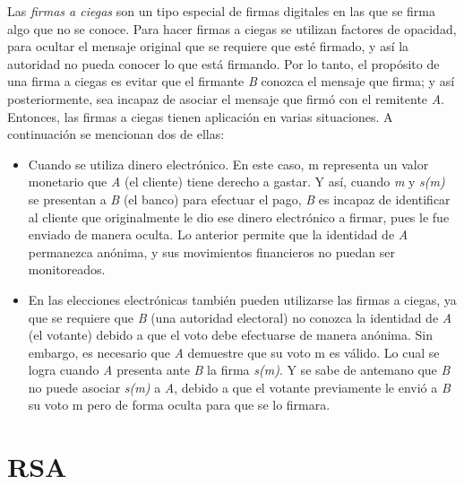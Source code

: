 Las \textit{firmas a ciegas} son un tipo especial de firmas digitales en las que se firma algo que no se conoce. Para hacer firmas a ciegas se utilizan factores de opacidad, para ocultar el mensaje original que se requiere que esté firmado, y así la autoridad no pueda conocer lo que está firmando.
Por lo tanto, el propósito de una firma a ciegas es evitar que el firmante \textit{B} conozca el mensaje que firma; y así posteriormente, sea incapaz de asociar el mensaje que firmó con el remitente \textit{A}. Entonces, las firmas a ciegas tienen aplicación en varias situaciones. A continuación se mencionan dos de ellas:
\begin{itemize}
	\item Cuando se utiliza dinero electrónico. En este caso, m representa un valor monetario que \textit{A} (el cliente) tiene derecho a gastar. Y así, cuando \textit{m} y \textit{s(m)} se presentan a \textit{B} (el banco) para efectuar el pago, \textit{B} es incapaz de identificar al cliente que originalmente le dio ese dinero electrónico a firmar, pues le fue enviado de manera oculta. Lo anterior permite que la identidad de \textit{A} permanezca anónima, y sus movimientos financieros no puedan ser monitoreados.
	\item En las elecciones electrónicas también pueden utilizarse las firmas a ciegas, ya que se requiere que \textit{B} (una autoridad electoral) no conozca la identidad de \textit{A} (el votante) debido a que el voto debe efectuarse de manera anónima. Sin embargo, es necesario que \textit{A} demuestre que su voto m es válido. Lo cual se logra cuando \textit{A} presenta ante \textit{B} la firma \textit{s(m)}. Y se sabe de antemano que \textit{B} no puede asociar \textit{s(m)} a \textit{A}, debido a que el votante previamente le envió a \textit{B} su voto m pero de forma oculta para que se lo firmara. ~\cite{ciegas}
\end{itemize} 



\section{RSA}

